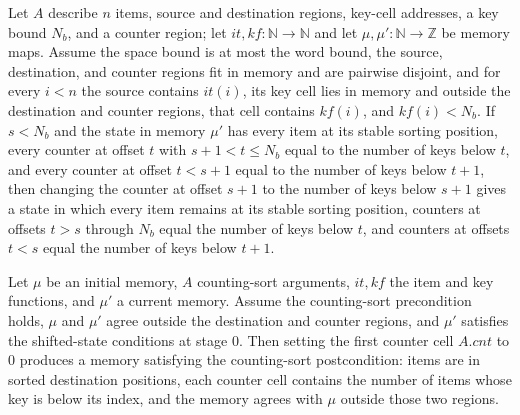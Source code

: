 \begin{theorem}
\label{Light.CsShifted.succ}
\leanok
{}
Let $A$ describe $n$ items, source and destination regions, key-cell addresses, a key
bound $N_b$, and a counter region; let $it,kf:\mathbb{N}\to\mathbb{N}$ and let
$\mu,\mu':\mathbb{N}\to\mathbb{Z}$ be memory maps. Assume the space bound is at most the
word bound, the source, destination, and counter regions fit in memory and are pairwise
disjoint, and for every $i<n$ the source contains $it(i)$, its key cell lies in memory
and outside the destination and counter regions, that cell contains $kf(i)$, and
$kf(i)<N_b$. If $s<N_b$ and the state in memory $\mu'$ has every item at its stable
sorting position, every counter at offset $t$ with $s+1<t\le N_b$ equal to the number of
keys below $t$, and every counter at offset $t<s+1$ equal to the number of keys below
$t+1$, then changing the counter at offset $s+1$ to the number of keys below $s+1$ gives
a state in which every item remains at its stable sorting position, counters at offsets
$t>s$ through $N_b$ equal the number of keys below $t$, and counters at offsets $t<s$
equal the number of keys below $t+1$.
\end{theorem}

\begin{theorem}
\label{Light.CsShifted.last}
\leanok
{}
Let $\mu$ be an initial memory, $A$ counting-sort arguments, $it,kf$ the item and key
functions, and $\mu\prime$ a current memory. Assume the counting-sort precondition holds,
$\mu$ and $\mu\prime$ agree outside the destination and counter regions, and
$\mu\prime$ satisfies the shifted-state conditions at stage $0$. Then setting the first
counter cell $A.cnt$ to $0$ produces a memory satisfying the counting-sort postcondition:
items are in sorted destination positions, each counter cell contains the number of items
whose key is below its index, and the memory agrees with $\mu$ outside those two regions.
\end{theorem}

